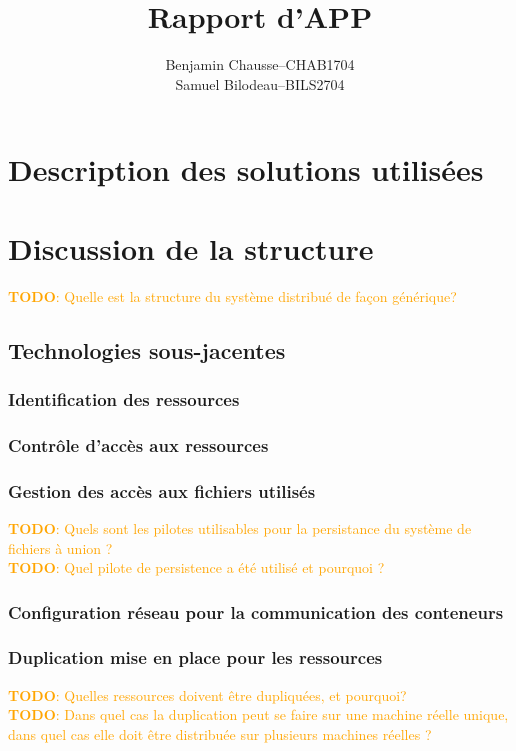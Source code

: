 \documentclass[a11paper, 11pt]{article}
\title{Rapport d'APP}
\author{
  \addtolength{\tabcolsep}{-0.4em}
  \begin{tabular}{rcl} %
  Benjamin Chausse & -- & CHAB1704 \\
  Samuel Bilodeau  & -- & BILS2704 \\
  \end{tabular}
}
\newcommand{\todo}[1]{\textcolor{orange}{\textbf{TODO}: #1}}
\begin{document}
\maketitle
\newpage
\tableofcontents
\newpage

\section{Description des solutions utilisées}

\section{Discussion de la structure}

\todo{Quelle est la structure du système distribué de façon générique?} \\

\subsection{Technologies sous-jacentes}

\subsubsection{Identification des ressources}

\subsubsection{Contrôle d'accès aux ressources}

\subsubsection{Gestion des accès aux fichiers utilisés}

\todo{Quels sont les pilotes utilisables pour la persistance du système de fichiers
à union ?} \\
\todo{Quel pilote de persistence a été utilisé et pourquoi ?}

\subsubsection{Configuration réseau pour la communication des conteneurs}

\subsubsection{Duplication mise en place pour les ressources}

\todo{Quelles ressources doivent être dupliquées, et pourquoi?} \\
\todo{Dans quel cas la duplication peut se faire sur une machine réelle unique, dans
quel cas elle doit être distribuée sur plusieurs machines réelles ?}


\end{document}
